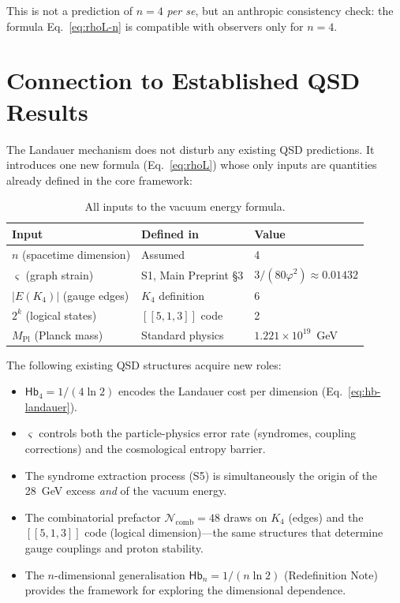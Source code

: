 \documentclass[11pt,a4paper]{article}
\theoremstyle{definition}
\newcommand{\Hb}{\mathsf{Hb}}
\newcommand{\Hbn}{\Hb_n}
\newcommand{\Hbfour}{\Hb_4}
\newcommand{\gs}{\varsigma}                %
\newcommand{\Mpl}{M_{\text{Pl}}}
\newcommand{\Ncomb}{\mathcal{N}_{\text{comb}}}
\begin{document}
This is not a prediction of $n = 4$ \textit{per se}, but an anthropic consistency check: the formula Eq.~\eqref{eq:rhoL-n} is compatible with observers only for $n = 4$.


\section{Connection to Established QSD Results}

The Landauer mechanism does not disturb any existing QSD predictions. It introduces one new formula (Eq.~\ref{eq:rhoL}) whose only inputs are quantities already defined in the core framework:

\begin{table}[h]
\centering
\begin{tabular}{lll}
\toprule
\textbf{Input} & \textbf{Defined in} & \textbf{Value} \\
\midrule
$n$ (spacetime dimension) & Assumed & 4 \\
$\gs$ (graph strain) & S1, Main Preprint \S3 & $3/(80\varphi^2) \approx 0.01432$ \\
$|E(K_4)|$ (gauge edges) & $K_4$ definition & 6 \\
$2^k$ (logical states) & $[[5,1,3]]$ code & 2 \\
$\Mpl$ (Planck mass) & Standard physics & $1.221 \times 10^{19}$~GeV \\
\bottomrule
\end{tabular}
\caption{All inputs to the vacuum energy formula.}
\end{table}

The following existing QSD structures acquire new roles:

\begin{itemize}[nosep]
    \item $\Hbfour = 1/(4\ln 2)$ encodes the Landauer cost per dimension (Eq.~\ref{eq:hb-landauer}).
    \item $\gs$ controls both the particle-physics error rate (syndromes, coupling corrections) and the cosmological entropy barrier.
    \item The syndrome extraction process (S5) is simultaneously the origin of the 28~GeV excess \emph{and} of the vacuum energy.
    \item The combinatorial prefactor $\Ncomb = 48$ draws on $K_4$ (edges) and the $[[5,1,3]]$ code (logical dimension)---the same structures that determine gauge couplings and proton stability.
    \item The $n$-dimensional generalisation $\Hbn = 1/(n\ln 2)$ (Redefinition Note) provides the framework for exploring the dimensional dependence.
\end{itemize}
\end{document}
